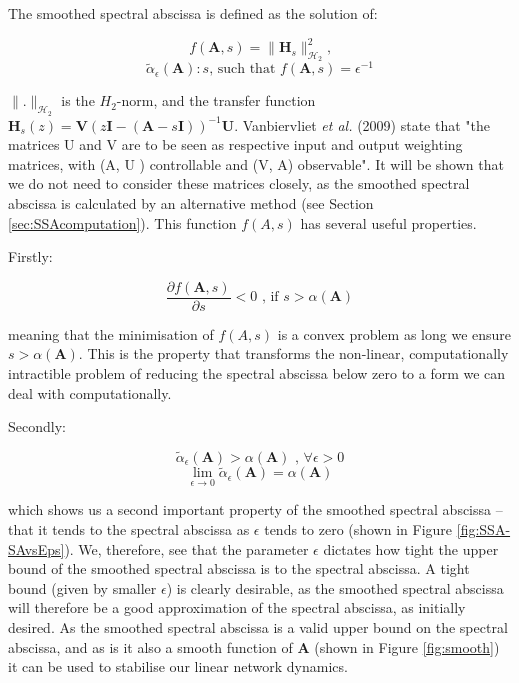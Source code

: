 \documentclass[12pt, a4paper]{article}
\begin{document}
The smoothed spectral abscissa is defined as the solution of\cite{Vanbiervliet2009}:

    \begin{equation}    f(\mathbf{A},s) = \|\mathbf{H}_s\|^2_{\mathcal{H}_2}             \text{,}   \label{eqn:ssaH2}          \end{equation}
    \begin{equation}   \tilde{\alpha}_\epsilon(\mathbf{A}) : s \text{, such that   } f(\mathbf{A}, s) = \epsilon^{-1}          \label{eqn:ssaDefinition} \end{equation}


\noindent $\|.\|_{\mathcal{H}_2}$ is the $H_2$-norm, and the transfer function $\mathbf{H}_s(z) = \mathbf{V}(z \mathbf{I} - (\mathbf{A} - s \mathbf{I}))^{-1} \mathbf{U} $.  Vanbiervliet \emph{et al.} (2009) state that "the matrices U and V are to be seen as respective input and output weighting matrices, with (A, U ) controllable and (V, A) observable".  It will be shown that we do not need to consider these matrices closely, as the smoothed spectral abscissa is calculated by an alternative method (see Section \ref{sec:SSAcomputation}).   This function $f(A,s)$ has several useful properties.  

Firstly: 

    \begin{equation}     \frac{\partial f(\mathbf{A},s)}{\partial s} < 0 \text{ , if }  s > \alpha(\mathbf{A})      \label{eqn:ssaConvex}    \end{equation}

\noindent meaning that the minimisation of $f(A,s)$ is a convex problem as long we ensure $s > \alpha(\mathbf{A})$. This is the property that transforms the non-linear, computationally intractible problem of reducing the spectral abscissa below zero to a form we can deal with computationally.  

Secondly:

    \begin{equation}    \tilde{\alpha}_\epsilon(\mathbf{A}) > \alpha(\mathbf{A}) \text{ , } \forall \epsilon > 0     \label{eqn:ssaCondition1}     \end{equation}
    \begin{equation}    \lim_{\epsilon \to 0} \tilde{\alpha}_\epsilon(\mathbf{A}) = \alpha(\mathbf{A})      \label{eqn:ssaCondition2}   \end{equation}

\noindent which shows us a second important property of the smoothed spectral abscissa -- that it tends to the spectral abscissa as $\epsilon$ tends to zero (shown in Figure \ref{fig:SSA-SAvsEps}).  We, therefore, see that the parameter $\epsilon$ dictates how tight the upper bound of the smoothed spectral abscissa is to the spectral abscissa.  A tight bound (given by smaller $\epsilon$)  is clearly desirable, as the smoothed spectral abscissa will therefore be a good approximation of the spectral abscissa, as initially desired. As the smoothed spectral abscissa is a valid upper bound on the spectral abscissa, and  as is it also a smooth function of $\mathbf{A}$ (shown in Figure \ref{fig:smooth}) it can be used to stabilise our linear network dynamics.
\end{document}
